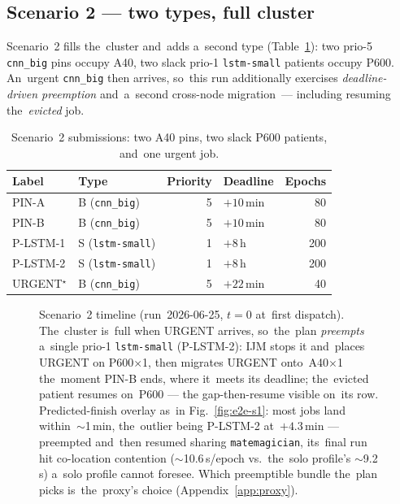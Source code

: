 \subsection{Scenario 2 --- two types, full cluster}
\label{sec:e2e-s2}

Scenario~2 fills the~cluster and~adds a~second type (Table~\ref{tab:e2e-s2-jobs}):
two prio-5 \texttt{cnn\_big} pins occupy A40, two slack prio-1 \texttt{lstm-small}
patients occupy P600.  An~urgent \texttt{cnn\_big} then arrives, so~this run
additionally exercises \emph{deadline-driven preemption} and~a~second cross-node
migration~--- including resuming the~\emph{evicted} job.

\begin{table}[H]\centering\small
\begin{tabular}{l l r l r}\toprule
Label & Type & Priority & Deadline & Epochs \\\midrule
PIN-A & B (\texttt{cnn\_big})    & 5 & $+10$\,min & 80 \\
PIN-B & B (\texttt{cnn\_big})    & 5 & $+10$\,min & 80 \\
P-LSTM-1 & S (\texttt{lstm-small}) & 1 & $+8$\,h   & 200 \\
P-LSTM-2 & S (\texttt{lstm-small}) & 1 & $+8$\,h   & 200 \\
URGENT$^{\star}$ & B (\texttt{cnn\_big}) & 5 & $+22$\,min & 40 \\\bottomrule
\end{tabular}
\caption{Scenario~2 submissions: two A40 pins, two slack P600 patients,
and~one urgent job.}\label{tab:e2e-s2-jobs}
\end{table}

\begin{figure}[H]\centering
\resizebox{\linewidth}{!}{}
\caption{Scenario~2 timeline (run~2026-06-25, $t{=}0$ at~first dispatch).
The~cluster is~full when URGENT arrives, so~the~plan \emph{preempts} a~single
prio-1 \texttt{lstm-small} (P-LSTM-2): IJM stops it and~places URGENT on
P600$\times$1, then migrates URGENT onto~A40$\times$1 the~moment PIN-B ends,
where it~meets its deadline; the~evicted patient resumes on~P600 --- the
gap-then-resume visible on~its row.  Predicted-finish overlay as~in
Fig.~\ref{fig:e2e-s1}: most jobs land within~$\sim$1\,min, the~outlier being
P-LSTM-2 at~$+4.3$\,min --- preempted and~then resumed sharing
\texttt{matemagician}, its~final run hit co-location contention
($\sim$10.6\,s/epoch vs.\ the~solo profile's $\sim$9.2\,s) a~solo profile
cannot foresee.  Which preemptible bundle the~plan picks is~the~proxy's choice
(Appendix~\ref{app:proxy}).}\label{fig:e2e-s2}
\end{figure}

